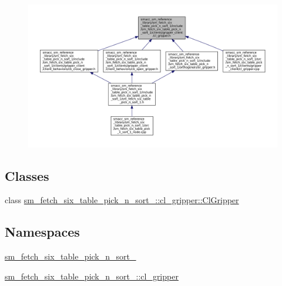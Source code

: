 \begin{figure}[H]
\begin{center}
\leavevmode
\includegraphics[width=350pt]{sm__fetch__six__table__pick__n__sort__1_2include_2sm__fetch__six__table__pick__n__sort__1_2clienf4850c4c0273685ff9a7a7ad2f1a3f8e}
\end{center}
\end{figure}
\subsection*{Classes}
\begin{DoxyCompactItemize}
\item 
class \hyperlink{classsm__fetch__six__table__pick__n__sort__1_1_1cl__gripper_1_1ClGripper}{sm\+\_\+fetch\+\_\+six\+\_\+table\+\_\+pick\+\_\+n\+\_\+sort\+\_\+::cl\+\_\+gripper\+::\+Cl\+Gripper}
\end{DoxyCompactItemize}
\subsection*{Namespaces}
\begin{DoxyCompactItemize}
\item 
 \hyperlink{namespacesm__fetch__six__table__pick__n__sort__1}{sm\+\_\+fetch\+\_\+six\+\_\+table\+\_\+pick\+\_\+n\+\_\+sort\+\_}
\item 
 \hyperlink{namespacesm__fetch__six__table__pick__n__sort__1_1_1cl__gripper}{sm\+\_\+fetch\+\_\+six\+\_\+table\+\_\+pick\+\_\+n\+\_\+sort\+\_\+::cl\+\_\+gripper}
\end{DoxyCompactItemize}
